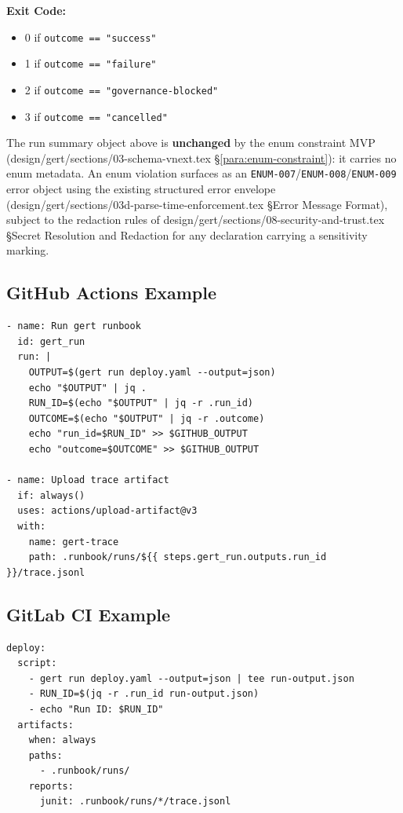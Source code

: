 \textbf{Exit Code:}
\begin{itemize}
  \item 0 if \texttt{outcome == "success"}
  \item 1 if \texttt{outcome == "failure"}
  \item 2 if \texttt{outcome == "governance-blocked"}
  \item 3 if \texttt{outcome == "cancelled"}
\end{itemize}

The run summary object above is \textbf{unchanged} by the enum constraint
MVP (design/gert/sections/03-schema-vnext.tex \S\ref{para:enum-constraint}):
it carries no enum metadata. An enum violation surfaces as an
\texttt{ENUM-007}/\texttt{ENUM-008}/\texttt{ENUM-009} error object using the
existing structured error envelope (design/gert/sections/03d-parse-time-enforcement.tex
\S Error Message Format), subject to the redaction rules of
design/gert/sections/08-security-and-trust.tex \S Secret Resolution and
Redaction for any declaration carrying a sensitivity marking.

\subsection{GitHub Actions Example}

\begin{verbatim}
- name: Run gert runbook
  id: gert_run
  run: |
    OUTPUT=$(gert run deploy.yaml --output=json)
    echo "$OUTPUT" | jq .
    RUN_ID=$(echo "$OUTPUT" | jq -r .run_id)
    OUTCOME=$(echo "$OUTPUT" | jq -r .outcome)
    echo "run_id=$RUN_ID" >> $GITHUB_OUTPUT
    echo "outcome=$OUTCOME" >> $GITHUB_OUTPUT

- name: Upload trace artifact
  if: always()
  uses: actions/upload-artifact@v3
  with:
    name: gert-trace
    path: .runbook/runs/${{ steps.gert_run.outputs.run_id }}/trace.jsonl
\end{verbatim}

\subsection{GitLab CI Example}

\begin{verbatim}
deploy:
  script:
    - gert run deploy.yaml --output=json | tee run-output.json
    - RUN_ID=$(jq -r .run_id run-output.json)
    - echo "Run ID: $RUN_ID"
  artifacts:
    when: always
    paths:
      - .runbook/runs/
    reports:
      junit: .runbook/runs/*/trace.jsonl
\end{verbatim}

